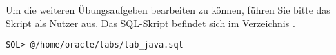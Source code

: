       \item Um die weiteren Übungsaufgeben bearbeiten zu können, führen Sie bitte das Skript  als Nutzer  aus. Das SQL-Skript befindet sich im Verzeichnis .
        \begin{lstlisting}[language=terminal]
SQL> @/home/oracle/labs/lab_java.sql
        \end{lstlisting}
